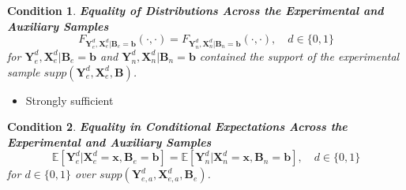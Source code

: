 \documentclass[static]{JJH-Beamer}
\newtheorem{condition}{Condition}
\begin{document}

\begin{frame}

\begin{condition} \textbf{Equality of Distributions Across the Experimental and Auxiliary Samples \label{cond:cond1}}
\begin{equation}
F_{\bm{Y}_e^d, \bm{X}_e^d | \bm{B}_e = \bm{b}} \left( \cdot, \cdot \right) = F_{\bm{Y}_n^d, \bm{X}_n^d | \bm{B}_n = \bm{b}} \left( \cdot, \cdot \right), \quad d \in \{0,1\}
\end{equation}
\noindent for $\bm{Y}_e^d, \bm{X}^d_e | \bm{B}_e = \bm{b}$ and $\bm{Y}_n^d, \bm{X}^d_n | \bm{B}_n = \bm{b}$ contained the support of the experimental sample $supp\left(\bm{Y}^d_{e}, \bm{X}^d_{e}, \bm{B}\right)$.
\end{condition}

\end{frame}


\begin{itemize}
\item Strongly sufficient
\end{itemize}

\begin{frame}

\begin{condition} \textbf{Equality in Conditional Expectations Across the Experimental and Auxiliary Samples \label{cond:cond2}}
\begin{equation}
\mathbb{E} \left[ \bm{Y}_e^d |  \bm{X}_e^d = \bm{x}, \bm{B}_e = \bm{b} \right] = \mathbb{E} \left[ \bm{Y}_n^d |  \bm{X}_n^d = \bm{x}, \bm{B}_n = \bm{b} \right], \quad d \in \{0,1\}
\end{equation}
for $d \in \{0, 1 \}$ over $supp\left(\bm{Y}^d_{e,a}, \bm{X}^d_{e,a}, \bm{B}_e\right)$.
\end{condition}

\end{frame}
\end{document}
